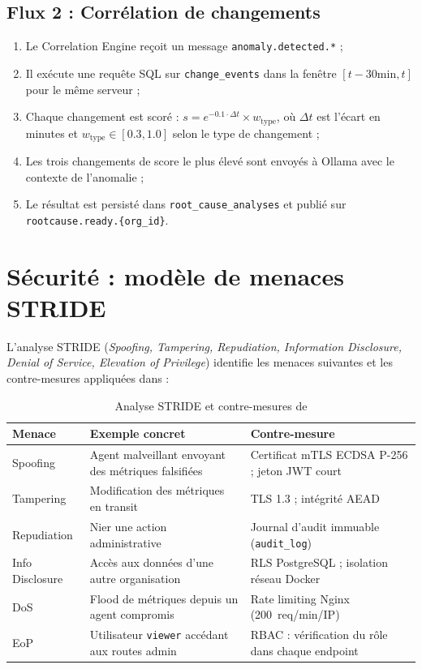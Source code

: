 \subsection{Flux 2 : Corrélation de changements}

\begin{enumerate}
  \item Le Correlation Engine reçoit un message \texttt{anomaly.detected.*} ;
  \item Il exécute une requête SQL sur \texttt{change\_events} dans la fenêtre
    $[t - 30\text{min}, t]$ pour le même serveur ;
  \item Chaque changement est scoré :
    $s = e^{-0.1 \cdot \Delta t} \times w_{\text{type}}$,
    où $\Delta t$ est l'écart en minutes et $w_{\text{type}} \in [0.3, 1.0]$
    selon le type de changement ;
  \item Les trois changements de score le plus élevé sont envoyés à Ollama avec
    le contexte de l'anomalie ;
  \item Le résultat est persisté dans \texttt{root\_cause\_analyses} et publié
    sur \texttt{rootcause.ready.\{org\_id\}}.
\end{enumerate}

\section{Sécurité : modèle de menaces STRIDE}

L'analyse STRIDE (\textit{Spoofing, Tampering, Repudiation, Information Disclosure,
Denial of Service, Elevation of Privilege}) identifie les menaces suivantes et
les contre-mesures appliquées dans \caimp{} :

\begin{table}[H]
\centering
\caption{Analyse STRIDE et contre-mesures de \caimp{}}
\label{tab:stride}
\small
\begin{tabularx}{\textwidth}{lXX}
\toprule
\textbf{Menace} & \textbf{Exemple concret} & \textbf{Contre-mesure} \\
\midrule
Spoofing       & Agent malveillant envoyant des métriques falsifiées
               & Certificat mTLS ECDSA P-256 ; jeton JWT court \\
Tampering      & Modification des métriques en transit
               & TLS 1.3 ; intégrité AEAD \\
Repudiation    & Nier une action administrative
               & Journal d'audit immuable (\texttt{audit\_log}) \\
Info Disclosure& Accès aux données d'une autre organisation
               & RLS PostgreSQL ; isolation réseau Docker \\
DoS            & Flood de métriques depuis un agent compromis
               & Rate limiting Nginx (200~req/min/IP) \\
EoP            & Utilisateur \texttt{viewer} accédant aux routes admin
               & RBAC : vérification du rôle dans chaque endpoint \\
\bottomrule
\end{tabularx}
\end{table}

